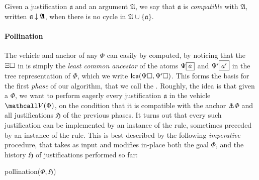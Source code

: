 \begin{scope}
\begin{definition}[Compatibility]
  Given a justification $\mathfrak{a}$ and an argument $\mathfrak{A}$, we say
  that $\mathfrak{a}$ is \emph{compatible} with $\mathfrak{A}$, written
  $\mathfrak{a} \mathbin{\downarrow} \mathfrak{A}$, when there is no cycle in $\mathfrak{A}
  \cup \{\mathfrak{a}\}$.
\end{definition}

\paragraph{Pollination}

The vehicle and anchor of any  $\Phi$ can easily by computed, by noticing
that the  $\Xi\square$ in  is simply the \emph{least
common ancestor} of the atoms $\Psi\fbox{$a$}$ and $\Psi'\fbox{$a'$}$ in the
tree representation of $\Phi$, which we write $\mathsf{lca}(\Psi\square,\Psi'\square)$.
This forms the basis for the first \emph{phase} of our algorithm, that we call
the . Roughly, the idea
is that given a  $\Phi$, we want to perform eagerly every justification
$\mathfrak{a}$ in the vehicle $\vehicle{\Phi}$, on the condition that it is
compatible with the anchor $\anchor{\Phi}$ and all justifications $\mathfrak{H}$
of the previous phases. It turns out that every such justification can be
implemented by an instance of the  rule, sometimes preceded by an
instance of the  rule. This is best described by the following
\emph{imperative} procedure, that takes as input and modifies in-place both the
goal $\Phi$, and the history $\mathfrak{H}$ of justifications performed so far:

\DontPrintSemicolon

\begin{procedure}[H]
  \caption{pollination($\Phi, \mathfrak{H}$)}
  \BlankLine

\end{procedure}


\end{scope}
